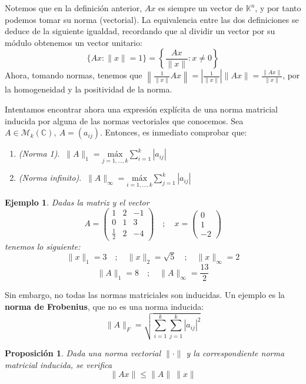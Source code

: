 \documentclass[11pt, a4paper]{article}
\newif\IfInSansMode
\numberwithin{equation}{section}
\theoremstyle{theorem-style}
\newtheorem{nprop}{Proposición}[section]
\theoremstyle{definition-style}
\theoremstyle{remark-style}
\theoremstyle{example-style}
\newtheorem{ejemplo}{Ejemplo}[section]
\newenvironment{nlist}
{\begin{enumerate}
    \renewcommand\labelenumi{(\emph{\roman{enumi})}}}
  {\end{enumerate}}
\begin{document}
Notemos que en la definición anterior, $Ax$ es siempre un vector de $\mathbb K^n$, y por tanto podemos tomar su norma (vectorial). La equivalencia entre las dos definiciones se deduce de la siguiente igualdad, recordando que al dividir un vector por su módulo obtenemos un vector unitario: $$\{Ax : \|x\| = 1 \} =  \left\{\frac{Ax}{\|x\|} : x\ne0\right\}$$
Ahora, tomando normas, tenemos que $\displaystyle \left\|\frac{1}{\|x\|}Ax\right\| = \left| \frac{1}{\|x\|}\right| \|Ax\| = \frac{\|Ax\|}{\|x\|}$, por la homogeneidad y la positividad de la norma.

Intentamos encontrar ahora una expresión explícita de una norma matricial inducida por alguna de las normas vectoriales que conocemos. Sea $A \in \mathcal M_k(\mathbb{C}), \ A = (a_{ij})$. Entonces, es inmediato comprobar que:

\begin{nlist}
	\item \textit{(Norma 1)}. $\displaystyle \ \|A\|_1 = \underset{j=1,\dots,k}{\text{máx}} \sum_{i=1}^k |a_{ij}|$
	\item \textit{(Norma infinito)}. $\displaystyle \ \|A\|_\infty = \underset{i=1,\dots,k}{\text{máx}} \sum_{j=1}^k |a_{ij}|$
\end{nlist}

\begin{ejemplo}
    Dadas la matriz y el vector $$A = \begin{pmatrix}
        1 & 2 & -1 \\
        0 & 1 & 3 \\
        \frac{1}{2} & 2 & -4
    \end{pmatrix}\quad;\quad x = \begin{pmatrix}
        0 \\
        1 \\
        -2
    \end{pmatrix}$$
    tenemos lo siguiente: $$
        \|x\|_1 = 3 \quad ; \quad
        \|x\|_2 = \sqrt{5} \quad ; \quad
        \|x\|_{\infty} = 2
$$
$$
        \|A\|_1 = 8 \quad ; \quad
        \|A\|_{\infty} = \frac{13}{2}
$$
\end{ejemplo}

Sin embargo, no todas las normas matriciales son inducidas. Un ejemplo es la \textbf{norma de Frobenius}, que no es una norma inducida: $$\|A\|_F = \sqrt{\sum_{i=1}^k \sum_{j=1}^k |a_{ij}|^2}$$

\begin{nprop} \label{norma_matricial_vec}
    Dada una norma vectorial $\|\cdot\|$ y la correspondiente norma matricial inducida, se verifica $$\|Ax\| \leq \|A\| \ \|x\|$$
\end{nprop}
\end{document}
